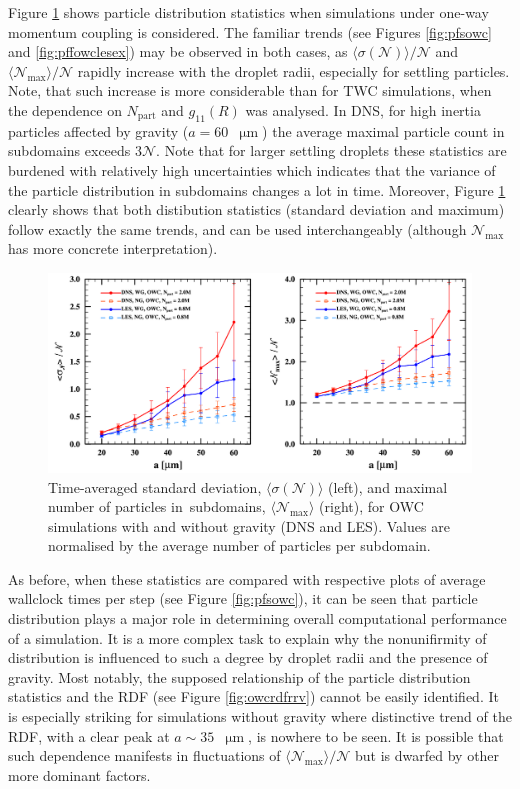 \documentclass{pracamgren}
\begin{document}
Figure \ref{fig:pfpowc} shows particle distribution statistics when simulations under one-way momentum coupling is considered.
The familiar trends (see Figures \ref{fig:pfsowc} and \ref{fig:pffowclesex}) may be observed in both cases, as $\langle \sigma(\mathcal{N}) \rangle / \mathcal{N}$ and $\langle \mathcal{N}_{\max} \rangle / \mathcal{N}$ rapidly increase with the droplet radii, especially for settling particles.
Note, that such increase is more considerable than for TWC simulations, when the dependence on $N_{\text{part}}$ and $g_{11}(R)$ was analysed.
In DNS, for high inertia particles affected by gravity ($a = 60$~$\upmu\text{m}$) the average maximal particle count in subdomains exceeds $3 \mathcal{N}$.
Note that for larger settling droplets these statistics are burdened with relatively high uncertainties which indicates that the variance of the particle distribution in subdomains changes a lot in time.
Moreover, Figure \ref{fig:pfpowc} clearly shows that both distibution statistics (standard deviation and maximum) follow exactly the same trends, and can be used interchangeably (although $\mathcal{N}_{\max}$ has more concrete interpretation).

\begin{figure}[h]
\centering
\includegraphics[width=13.5cm]{img/plots/3-4c-pfpowc.pdf}
\caption{
Time-averaged standard deviation, $\langle \sigma(\mathcal{N}) \rangle$ (left), and maximal number of particles in~subdomains, $\langle \mathcal{N}_{\max} \rangle$ (right), for OWC simulations with and without gravity (DNS and LES).
Values are normalised by the average number of particles per subdomain.
}
\label{fig:pfpowc}
\end{figure}

As before, when these statistics are compared with respective plots of average wallclock times per step (see Figure \ref{fig:pfsowc}), it can be seen that particle distribution plays a major role in determining overall computational performance of a simulation.
It is a more complex task to explain why the nonunifirmity of distribution is influenced to such a degree by droplet radii and the presence of gravity.
Most notably, the supposed relationship of the particle distribution statistics and the RDF (see Figure \ref{fig:owcrdfrrv}) cannot be easily identified.
It is especially striking for simulations without gravity where distinctive trend of the RDF, with a clear peak at $a \sim 35$~$\upmu\text{m}$, is nowhere to be seen.
It is possible that such dependence manifests in fluctuations of $\langle \mathcal{N}_{\max} \rangle / \mathcal{N}$ but is dwarfed by other more dominant factors.
  
\end{document}
